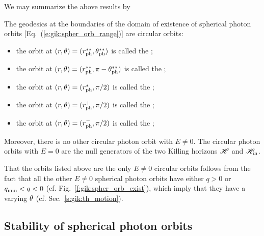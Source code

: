 We may summarize the above results by
\begin{prop}
The geodesics at the boundaries of the domain of
existence of spherical photon orbits [Eq.~(\ref{e:gik:spher_orb_range})] are circular orbits:
\begin{itemize}
\item the orbit at $(r,\theta)=(r_{\rm ph}^{**},\theta_{\rm ph}^{**})$ is called
the ;
\item the orbit at $(r,\theta)=(r_{\rm ph}^{**},\pi - \theta_{\rm ph}^{**})$ is called
the ;
\item the orbit at $(r,\theta)=(r_{\rm ph}^*,\pi/2)$ is called the ;
\item the orbit at $(r,\theta)=(r_{\rm ph}^+,\pi/2)$ is called the ;
\item the orbit at $(r,\theta)=(r_{\rm ph}^-,\pi/2)$ is called the ;
\end{itemize}
Moreover, there is no other circular photon orbit with $E\neq 0$. The circular photon orbits
with $E=0$ are the null generators of the two Killing horizons $\mathscr{H}$ and $\mathscr{H}_{\rm in}$.
\end{prop}
That the orbits listed above are the only $E\neq 0$ circular orbits follows from the fact
that all the other $E\neq 0$ spherical photon orbits have either $q > 0$ or $q_{\rm min} < q < 0$
(cf. Fig.~\ref{f:gik:spher_orb_exist}), which imply that they have a varying $\theta$
(cf. Sec.~\ref{s:gik:th_motion}).

\subsection{Stability of spherical photon orbits} \label{s:gik:spher_stability}

